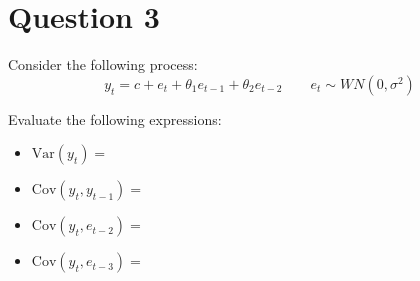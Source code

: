 \documentclass[12pt]{article}
\begin{document}

\section*{Question 3 }

Consider the following process:
\begin{equation*}
    y_{t} = c + e_{t} + \theta_1 e_{t-1} + \theta_2 e_{t-2} \qquad e_{t} \sim WN(0, \sigma^{2})
\end{equation*}

Evaluate the following expressions:
\begin{itemize}
    \item $ \mathrm{Var} \left( y_{t} \right) = $
          \vspace{2cm}
    \item $ \mathrm{Cov} \left( y_{t}, y_{t-1} \right) = $
          \vspace{2cm}
    \item $ \mathrm{Cov} \left( y_{t}, e_{t-2} \right) = $
          \vspace{2cm}
    \item $ \mathrm{Cov} \left( y_{t}, e_{t-3} \right) = $
          \vspace{2cm}
\end{itemize}

\end{document}
